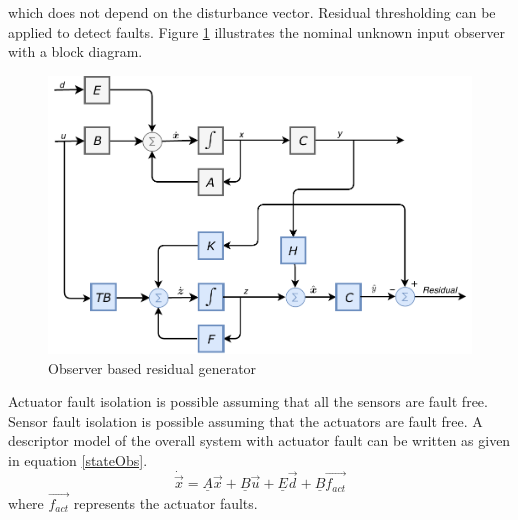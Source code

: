 which does not depend on the disturbance vector. Residual thresholding can be applied to detect faults.
Figure \ref{fig:residualobs} illustrates the nominal unknown input observer with a block diagram. 
\begin{figure}[H]
	\centering
	\includegraphics[width=0.8\linewidth]{figures/UIO}
	\caption{Observer based residual generator}
	\label{fig:residualobs}
\end{figure}



Actuator fault isolation is possible assuming that all the sensors are fault free. Sensor fault isolation is possible assuming that the actuators are fault free. A descriptor model of the overall system with actuator fault can be written as given in equation \ref{stateObs}.
\begin{equation}
\dot{\vec{x}} = \underline A\vec{x}+\underline B \vec{u}+\underline E\vec{d} + \underline B\vec{f_{act}}
\label{stateObs34}
\end{equation}
where $\vec{f_{act}}$ represents the actuator faults. 

